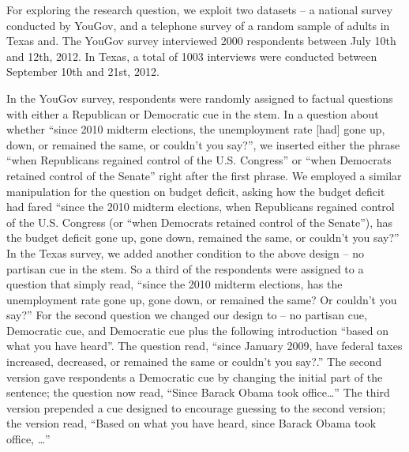 \documentclass[12pt, letterpaper]{article}
\begin{document}
For exploring the research question, we exploit two datasets – a national survey conducted by YouGov, and a telephone survey of a random sample of adults in Texas and. The YouGov survey interviewed 2000 respondents between July 10th and 12th, 2012.  In Texas, a total of 1003 interviews were conducted between September 10th and 21st, 2012. 

In the YouGov survey, respondents were randomly assigned to factual questions with either a Republican or Democratic cue in the stem. In a question about whether ``since 2010 midterm elections, the unemployment rate [had] gone up, down, or remained the same, or couldn't you say?'', we inserted either the phrase “when Republicans regained control of the U.S. Congress'' or ``when Democrats retained control of the Senate” right after the first phrase. We employed a similar manipulation for the question on budget deficit, asking how the budget deficit had fared “since the 2010 midterm elections, when Republicans regained control of the U.S. Congress (or ``when Democrats retained control of the Senate''), has the budget deficit gone up, gone down, remained the same, or couldn't you say?''
In the Texas survey, we added another condition to the above design – no partisan cue in the stem. So a third of the respondents were assigned to a question that simply read, ``since the 2010 midterm elections, has the unemployment rate gone up, gone down, or remained the same?  Or couldn’t you say?'' For the second question we changed our design to – no partisan cue, Democratic cue, and Democratic cue plus the following introduction “based on what you have heard”. The question read, ``since January 2009, have federal taxes increased, decreased, or remained the same or couldn’t you say?.'' The second version gave respondents a Democratic cue by changing the initial part of the sentence; the question now read, “Since Barack Obama took office\ldots''  The third version prepended a cue designed to encourage guessing to the second version; the version read, “Based on what you have heard, since Barack Obama took office, \ldots''

\clearpage
\end{document}
